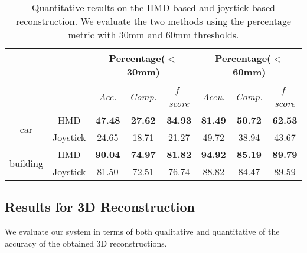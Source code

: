 \documentclass[journal]{IEEEtran}
\begin{document}
\begin{table*}[t]
  \caption{Quantitative results on the HMD-based and joystick-based reconstruction. We evaluate the two 
    methods using the percentage metric with 30mm and 60mm thresholds.}
  \begin{center}
    \begin{tabular}{ccccc|ccc}
      \hline
                                &                               & \multicolumn{3}{c|}{Percentage($<$30mm)}         & \multicolumn{3}{c}{Percentage($<$60mm)}          \\ \hline
      \multicolumn{1}{r}{}      & \multicolumn{1}{c|}{}         & \textit{Acc.} & \textit{Comp.} & \textit{f-score} & \textit{Accu.} & \textit{Comp.} & \textit{f-score} \\ \hline
      \multirow{2}{*}{car}      & \multicolumn{1}{c|}{HMD}      &\textbf{47.48}      &\textbf{27.62}       &\textbf{34.93}                  &\textbf{81.49}      &\textbf{50.72}       &\textbf{62.53}                  \\
                                & \multicolumn{1}{c|}{Joystick} &24.65      &18.71       &21.27                  &49.72      &38.94       &43.67                  \\ \hline
      \multirow{2}{*}{building} & \multicolumn{1}{c|}{HMD}      &\textbf{90.04}      &\textbf{74.97}       &\textbf{81.82}                  &\textbf{94.92}       &\textbf{85.19}       &\textbf{89.79}                  \\
                                & \multicolumn{1}{c|}{Joystick} &81.50      &72.51       &76.74                  &88.82       &84.47       &89.59                  \\ \hline
      \end{tabular}
  \end{center}
  \label{table:ReconEva}
\end{table*}

\subsection{Results for 3D Reconstruction}
We evaluate our system in terms of both qualitative and   
quantitative of the accuracy of the obtained 3D reconstructions. 
\end{document}
